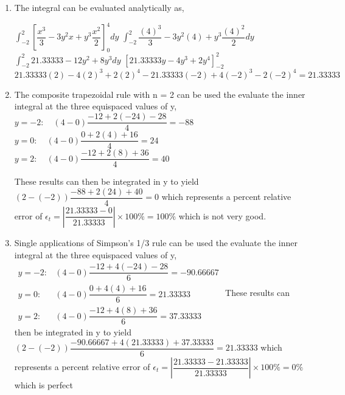 \documentclass[../main.tex]{subfiles}
\begin{document}
\section{}
\begin{enumerate}[label=\bfseries(\alph*)]
\item The integral can be evaluated analytically as,
	\bigbreak

$\displaystyle\int_{-2}^{2}\left[\dfrac{x^{3}}{3}-3 y^{2} x+y^{3} \dfrac{x^{2}}{2}\right]_{0}^{4} d y$ \bigbreak
$\displaystyle\int_{-2}^{2} \dfrac{(4)^{3}}{3}-3 y^{2}(4)+y^{3} \dfrac{(4)^{2}}{2} d y$ \bigbreak
$\displaystyle\int_{-2}^{2} 21.33333-12 y^{2}+8 y^{3} d y$ \bigbreak
${\left[21.33333 y-4 y^{3}+2 y^{4}\right]_{-2}^{2}}$ \bigbreak
$21.33333(2)-4(2)^{3}+2(2)^{4}-21.33333(-2)+4(-2)^{3}-2(-2)^{4}=21.33333$ \bigbreak

\item The composite trapezoidal rule with n = 2 can be used the evaluate the inner integral at
the three equispaced values of y,
	\bigbreak
$y=-2: \quad(4-0) \dfrac{-12+2(-24)-28}{4}=-88$ \bigbreak
$y=0: \quad(4-0) \dfrac{0+2(4)+16}{4}=24$ \bigbreak
$y=2: \quad(4-0) \dfrac{-12+2(8)+36}{4}=40$ \bigbreak

These results can then be integrated in y to yield
	\bigbreak
$(2-(-2)) \dfrac{-88+2(24)+40}{4}=0$
	\bigbreak
which represents a percent relative error of
	\bigbreak
$\epsilon_{t}=\left|\dfrac{21.33333-0}{21.33333}\right| \times 100 \%=100 \%$ 
	\bigbreak
which is not very good.
	\bigbreak

\item Single applications of Simpson’s 1/3 rule can be used the evaluate the inner integral at
the three equispaced values of y,
	\bigbreak
$
\begin{array}{ll}
y=-2: & (4-0) \dfrac{-12+4(-24)-28}{6}=-90.66667 \\
y=0: & (4-0) \dfrac{0+4(4)+16}{6}=21.33333 \\
y=2: & (4-0) \dfrac{-12+4(8)+36}{6}=37.33333
\end{array}
$
	\bigbreak
These results can then be integrated in y to yield
	\bigbreak
$(2-(-2)) \dfrac{-90.66667+4(21.33333)+37.33333}{6}=21.33333$
	\bigbreak
which represents a percent relative error of
	\bigbreak
$\epsilon_{t}=\left|\dfrac{21.33333-21.33333}{21.33333}\right| \times 100 \%=0 \%$
	\bigbreak
which is perfect
	\bigbreak
\end{enumerate}
\end{document}
